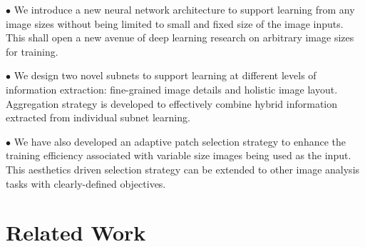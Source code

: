 \documentclass[10pt,twocolumn,letterpaper]{article}
\begin{document}

$\bullet$ We introduce a new neural network architecture to support learning from any image sizes without being limited to small and fixed size of the image inputs. This shall open a new avenue of deep learning research on arbitrary image sizes for training.

$\bullet$ We design two novel subnets to support learning at different levels of information extraction: fine-grained image details and holistic image layout. Aggregation strategy is developed to effectively combine hybrid information extracted from individual subnet learning.

$\bullet$ We have also developed an adaptive patch selection strategy to enhance the training efficiency associated with variable size images being used as the input. This aesthetics driven selection strategy can be extended to other image analysis tasks with clearly-defined objectives.


\section{Related Work}
\end{document}
